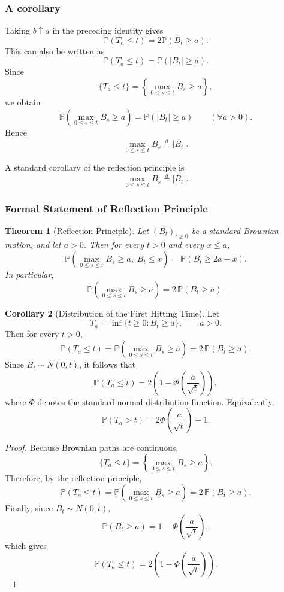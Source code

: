 \documentclass[11pt]{article}
\newtheorem{theorem}{Theorem}[section]
\theoremstyle{definition}
\newtheorem{corollary}[theorem]{Corollary}
\begin{document}
\subsubsection{A corollary}

Taking \(b\uparrow a\) in the preceding identity gives
\[
\mathbb P(T_a\le t)=2\mathbb P(B_t\ge a).
\]
This can also be written as
\[
\mathbb P(T_a\le t)=\mathbb P(|B_t|\ge a).
\]
Since
\[
\{T_a\le t\}
=
\left\{\max_{0\le s\le t}B_s\ge a\right\},
\]
we obtain
\[
\mathbb P\!\left(\max_{0\le s\le t} B_s\ge a\right)
=
\mathbb P(|B_t|\ge a)
\qquad (\forall a>0).
\]
Hence
\[
\max_{0\le s\le t} B_s
\overset{d}=|B_t|.
\]

\begin{keyformula}
A standard corollary of the reflection principle is
\[
\max_{0\le s\le t} B_s \overset{d}= |B_t|.
\]
\end{keyformula}

\subsubsection{Formal Statement of Reflection Principle}

\begin{theorem}[Reflection Principle]
Let \((B_t)_{t\ge 0}\) be a standard Brownian motion, and let \(a>0\). Then for every \(t>0\) and every \(x\le a\),
\[
\mathbb P\!\left(\max_{0\le s\le t} B_s \ge a,\; B_t\le x\right)
=
\mathbb P(B_t\ge 2a-x).
\]
In particular,
\[
\mathbb P\!\left(\max_{0\le s\le t} B_s \ge a\right)
=
2\,\mathbb P(B_t\ge a).
\]
\end{theorem}

\begin{corollary}[Distribution of the First Hitting Time]
Let
\[
T_a=\inf\{t\ge 0:B_t\ge a\}, \qquad a>0.
\]
Then for every \(t>0\),
\[
\mathbb P(T_a\le t)
=
\mathbb P\!\left(\max_{0\le s\le t} B_s\ge a\right)
=
2\,\mathbb P(B_t\ge a).
\]
Since \(B_t\sim N(0,t)\), it follows that
\[
\mathbb P(T_a\le t)
=
2\left(1-\Phi\!\left(\frac{a}{\sqrt t}\right)\right),
\]
where \(\Phi\) denotes the standard normal distribution function.
Equivalently,
\[
\mathbb P(T_a>t)
=
2\Phi\!\left(\frac{a}{\sqrt t}\right)-1.
\]
\end{corollary}

\begin{proof}
Because Brownian paths are continuous,
\[
\{T_a\le t\}
=
\left\{\max_{0\le s\le t} B_s\ge a\right\}.
\]
Therefore, by the reflection principle,
\[
\mathbb P(T_a\le t)
=
\mathbb P\!\left(\max_{0\le s\le t} B_s\ge a\right)
=
2\,\mathbb P(B_t\ge a).
\]
Finally, since \(B_t\sim N(0,t)\),
\[
\mathbb P(B_t\ge a)
=
1-\Phi\!\left(\frac{a}{\sqrt t}\right),
\]
which gives
\[
\mathbb P(T_a\le t)
=
2\left(1-\Phi\!\left(\frac{a}{\sqrt t}\right)\right).
\]
\end{proof}
\end{document}

